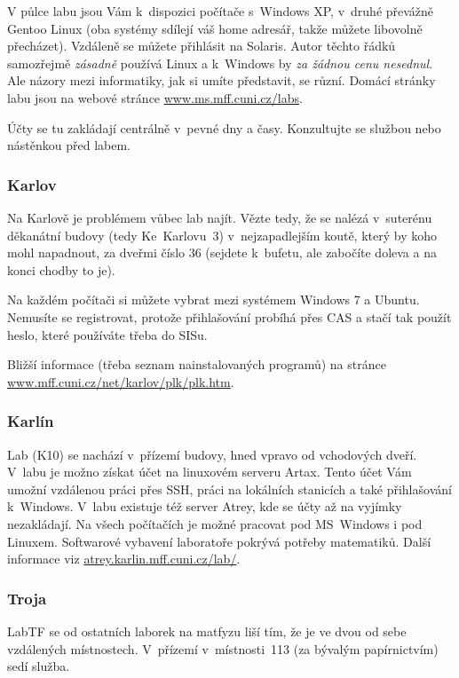 V půlce labu jsou Vám k~dispozici počítače s~Windows XP, v~druhé převážně Gentoo Linux (oba systémy sdílejí váš home adresář, takže můžete li\-bo\-vol\-ně pře\-chá\-zet). Vzdá\-le\-ně se můžete přihlásit na Solaris. Autor těchto řádků samozřejmě {\it zásadně} používá Linux a k~Windows by {\it za žádnou cenu nesednul}. Ale názory mezi informatiky, jak si umíte představit, se různí. Domácí stránky labu jsou na webové stránce \url{www.ms.mff.cuni.cz/labs}.

Účty se tu zakládají centrálně v~pevné dny a časy. Konzultujte se
službou nebo nástěnkou před labem.

\subsubsection{Karlov}

Na Karlově je problémem vůbec lab najít. Vězte tedy, že se nalézá
v~suterénu děkanátní budovy (tedy Ke~Karlovu~3) v~nejzapadlejším koutě,
který by koho mohl napadnout, za dveřmi číslo 36 (sejdete
k~bufetu, ale zabočíte doleva a na konci chodby to je). 

Na každém počítači si můžete vybrat mezi systémem Windows 7 a Ubuntu. Nemusíte se registrovat, protože přihlašování probíhá přes CAS a stačí tak použít heslo, které používáte třeba do SISu.

Bližší informace (třeba seznam nainstalovaných programů) na stránce \url{www.mff.cuni.cz/net/karlov/plk/plk.htm}.

\subsubsection{Karlín}

Lab (K10) se nachází v~přízemí budovy, hned vpravo od vchodových
dveří. V~labu je možno získat účet na linuxovém serveru Artax.
Tento účet Vám umožní vzdálenou práci přes SSH, práci na lokálních
stanicích a také přihlašování k~Windows. V~labu existuje též
server Atrey, kde se účty až na vyjímky nezakládají. Na všech
počítačích je možné pracovat pod MS~Windows i pod Linuxem.
Softwarové vybavení laboratoře pokrývá potřeby matematiků. Další
informace viz \url{atrey.karlin.mff.cuni.cz/lab/}.

\subsubsection{Troja}

LabTF se od ostatních laborek na matfyzu liší tím, že je ve dvou od
sebe vzdálených místnostech.  V~přízemí v~místnosti~113 (za
bývalým papírnictvím) sedí služba.

